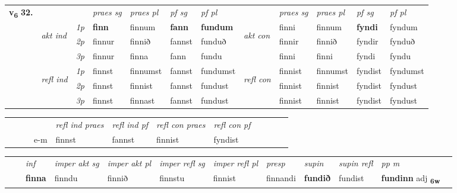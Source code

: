 \begin{tabular}{llllllllllll} \toprule
\multirow{4}{*}{{{\textbf{v{\textsubscript{6}}} \Large{\textbf{32.}}}}}  & &   &  \textit{praes sg}  & \textit{praes pl}  &\textit{ pf sg} & \textit{pf pl} &  &  \textit{praes sg}  & \textit{praes pl}  & \textit{pf sg} & \textit{pf pl } \\*
	\cmidrule{4-7} \cmidrule{9-12}
 & \multirow{3}{*}{\begin{turn}{90}\textit{akt ind}\end{turn}} & {\textit{1p}} & \textbf{finn} & finnum    & \textbf{fann} & \textbf{fundum} & \multirow{3}{*}{\begin{turn}{90}\textit{akt con}\end{turn}} &finni & finnum & \textbf{fyndi} & fyndum\\*
& &  {\textit{2p}} &  finnur  & finnið   & fannst & funduð & & finnir & finnið & fyndir & fynduð \\*
& &  {\textit{3p}} & finnur & finna   & fann & fundu & & finni & finni& fyndi & fyndu  \\*
\cmidrule{4-7} \cmidrule{9-12}
 &\multirow{3}{*}{\begin{turn}{90}\textit{refl ind}\end{turn}} & {\textit{1p}} & finnst & finnumst    & fannst & fundumst & \multirow{3}{*}{\begin{turn}{90}\textit{refl con}\end{turn}}  &finnist & finnumst & fyndist & fyndumst\\*
 &&  {\textit{2p}} &  finnst  & finnist   & fannst & fundust & &finnist & finnist & fyndist & fyndust \\*
& &  {\textit{3p}} & finnst & finnast   & fannst & fundust & & finnist & finnist& fyndist & fyndust  \\*
\cmidrule{4-7} \cmidrule{9-12}
\end{tabular}


\begin{tabular}{llllllllllll}
 & &  & &  \textit{refl ind praes} & \textit{refl ind pf} & \textit{refl con praes} & \textit{refl con pf} \\*
&  & & e-m & finnst & fannst & finnist & fyndist \\*
\cmidrule{5-9}
\end{tabular}


\begin{tabular}{llllllllllll}
 & & \textit{inf} & \textit{imper akt sg} & \textit{imper akt pl} & \textit{imper refl sg} & \textit{imper refl pl} & \textit{presp} & \textit{supin} & \textit{supin refl} & \textit{pp m}     \\*
  & & \textbf{finna} & finndu  & finnið & finnstu & finnist & finnandi &  \textbf{fundið} & fundist & \textbf{fundinn} adj \textbf{\textsubscript{6w}} \\*
\cmidrule{1-12}
\end{tabular}



